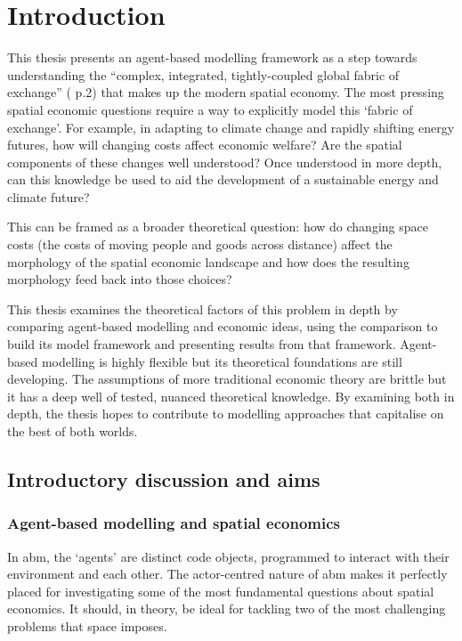 \chapter{Introduction \label{chapter:intro}}

This thesis presents an agent-based modelling framework as a step towards understanding the ``complex, integrated, tightly-coupled global fabric of exchange'' (\citealt{korowicz_tipping_2010} p.2) that makes up the modern spatial economy. The most pressing spatial economic questions require a way to explicitly model this `fabric of exchange'. For example, in adapting to climate change and rapidly shifting energy futures, how will changing costs affect economic welfare? Are the spatial components of these changes well understood? Once understood in more depth, can this knowledge be used to aid the development of a sustainable energy and climate future?

This can be framed as a broader theoretical question: how do changing space costs (the costs of moving people and goods across distance) affect the morphology of the spatial economic landscape and how does the resulting morphology feed back into those choices?

This thesis examines the theoretical factors of this problem in depth by comparing agent-based modelling and economic ideas, using the comparison to build its model framework and presenting results from that framework. Agent-based modelling is highly flexible but its theoretical foundations are still developing. The assumptions of more traditional economic theory are brittle but it has a deep well of tested, nuanced theoretical knowledge. By examining both in depth, the thesis hopes to contribute to modelling approaches that capitalise on the best of both worlds.


\section{Introductory discussion and aims}

\subsection{Agent-based modelling and spatial economics \label{sec:mot}}

In \gls{abm}, the `agents' are distinct code objects, programmed to interact with their environment and each other. The actor-centred nature of \gls{abm} makes it perfectly placed for investigating some of the most fundamental questions about spatial economics. It should, in theory, be ideal for tackling two of the most challenging problems that space imposes. 

